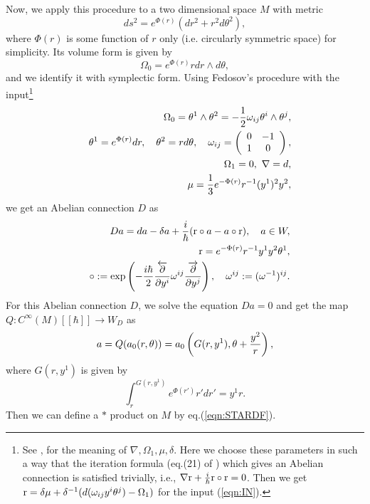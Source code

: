 \documentclass[12pt,a4paper]{article}
\def\h{\hbar}
\begin{document}
Now, we apply this procedure to a two dimensional space $M$ with metric
\begin{equation}
\label{eqn:MET}
ds^2=e^{\Phi(r)}(dr^2+r^2d\theta^2),
\end{equation}
where $\Phi(r)$ is some function of $r$ only (i.e. circularly
symmetric space) for simplicity.
Its volume form is given by
\begin{equation}
\Omega_0=e^{\Phi(r)}rdr\wedge d\theta,
\end{equation}
and we identify it with symplectic form. Using Fedosov's procedure with the input\footnote{
See \cite{Fedbk},\cite{AK2} for the meaning of $\nabla,\Omega_1,\mu,\delta$.
Here we choose these parameters in such a way that the iteration formula
(eq.(21) of \cite{AK2}) which gives an Abelian connection is satisfied
trivially, i.e., $\nabla{\rm r}+{i\over \h}{\rm r}\circ{\rm r}=0$. Then 
we get ${\rm
  r}=\delta\mu+\delta^{-1}(d(\omega_{ij}y^i\theta^j)-\Omega_1)$ for
the input (\ref{eqn:IN}).
}
\begin{eqnarray}
\label{eqn:IN}
&&\Omega_0=\theta^1\wedge\theta^2=-{1\over2}\omega_{ij}\theta^i\wedge\theta^j,\nonumber\\
&&\theta^1=e^{\Phi(r)}dr,\quad \theta^2=rd\theta,\quad
\omega_{ij}=\left(
\begin{array}{cc}
0  &  -1  \\
1  &   0
\end{array}
\right),\nonumber \\
&&\Omega_1=0,\ \nabla=d, \nonumber \\
&&\mu={1\over3}e^{-\Phi(r)}r^{-1}(y^1)^2y^2,
\end{eqnarray}
we get an Abelian connection $D$ as 
\begin{eqnarray}
&&Da=da-\delta a+{i\over\hbar}({\rm r}\circ a-a\circ {\rm r}),\quad a\in W,\nonumber \\
&&{\rm r}=e^{-\Phi(r)}r^{-1}y^1y^2\theta^1,\nonumber \\
&&\circ :=\exp\left(-{i\hbar\over2}{{\overleftarrow \partial}\over\partial y^i}\omega^{ij}{{\overrightarrow \partial}\over\partial y^j}\right),\quad \omega^{ij}:=(\omega^{-1})^{ij}.
\end{eqnarray}
For this Abelian connection $D$, we solve the equation $Da=0$ and get the map $Q:C^\infty(M)[[\hbar]]\rightarrow W_D$ as
\begin{equation}
\label{eqn:FLAT}
a=Q(a_0(r,\theta))=a_0\left(G(r,y^1),\theta+{y^2\over r}\right),
\end{equation}
where $G(r,y^1)$ is given by
\begin{equation}
\int_r^{G(r,y^1)}e^{\Phi(r')}r'dr'=y^1 r.
\end{equation}
Then we can define a $*$ product on $M$ by eq.(\ref{eqn:STARDF}).
\end{document}
